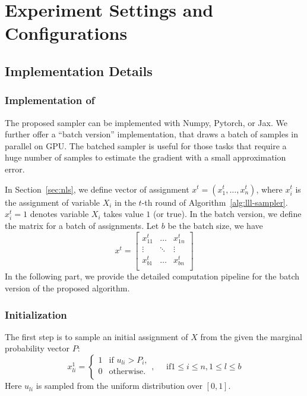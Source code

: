 \section{Experiment Settings and Configurations}
\label{appendix:exp-set}
\subsection{Implementation Details} \label{appendix:implementation}

\subsubsection{Implementation of \nls} The proposed sampler can be implemented with Numpy, Pytorch, or Jax. We further offer a ``batch version'' implementation, that draws a batch of samples in parallel on GPU. The batched sampler is useful for those tasks that require a huge number of samples to estimate the gradient with a small approximation error. 

{In Section~\ref{sec:nls}, we define  vector of assignment  $x^t=(x^t_1, \dots, x^t_n)$,
where $x_i^t$ is the assignment of variable $X_i$ in the $t$-th round of Algorithm~\ref{alg:lll-sampler}. $x^t_i=1$ denotes  variable $X_i$ takes value $1$ (or true). In the batch version, we define the matrix for a batch  of assignments. Let $b$ be the batch size, we have}
\begin{equation*}
x^{t}=\begin{bmatrix}
x^t_{11} & \dots & x^t_{1n} \\
  \vdots & \ddots & \vdots \\
x^t_{b1} & \dots & x^t_{bn} \\
\end{bmatrix}
\end{equation*}
{In the following part, we provide the detailed computation pipeline for the batch version of the proposed algorithm.} 



\subsubsection{Initialization} {The first step is to sample an initial assignment of $X$ from the given the marginal probability vector $P$:}
\begin{equation}
 x^1_{li} = \begin{cases}
 1&\text{if } u_{li}> P_i,\\
 0 &\text{otherwise}. \\
 \end{cases},\quad \text{ if} 1\le i\le n, 1\le l\le b
\end{equation}
{Here $u_{li}$ is sampled from the uniform distribution over $[0,1]$.}

